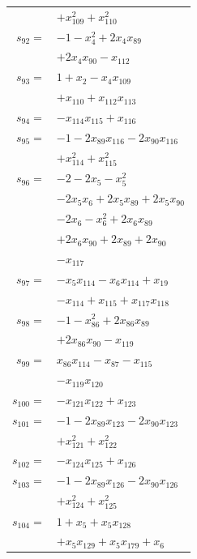 \begin{longtable}{@{}r@{\;}l@{}}
 & \(\displaystyle +x_{109}^{2} +x_{110}^{2}\) \\[3pt]
\(s_{92}=\) & \(\displaystyle -1 -x_{4}^{2} +2x_{4}x_{89}\) \\
 & \(\displaystyle +2x_{4}x_{90} -x_{112}\) \\[3pt]
\(s_{93}=\) & \(\displaystyle 1 +x_{2} -x_{4}x_{109}\) \\
 & \(\displaystyle +x_{110} +x_{112}x_{113}\) \\[3pt]
\(s_{94}=\) & \(\displaystyle -x_{114}x_{115} +x_{116}\) \\[3pt]
\(s_{95}=\) & \(\displaystyle -1 -2x_{89}x_{116} -2x_{90}x_{116}\) \\
 & \(\displaystyle +x_{114}^{2} +x_{115}^{2}\) \\[3pt]
\(s_{96}=\) & \(\displaystyle -2 -2x_{5} -x_{5}^{2}\) \\
 & \(\displaystyle -2x_{5}x_{6} +2x_{5}x_{89} +2x_{5}x_{90}\) \\
 & \(\displaystyle -2x_{6} -x_{6}^{2} +2x_{6}x_{89}\) \\
 & \(\displaystyle +2x_{6}x_{90} +2x_{89} +2x_{90}\) \\
 & \(\displaystyle -x_{117}\) \\[3pt]
\(s_{97}=\) & \(\displaystyle -x_{5}x_{114} -x_{6}x_{114} +x_{19}\) \\
 & \(\displaystyle -x_{114} +x_{115} +x_{117}x_{118}\) \\[3pt]
\(s_{98}=\) & \(\displaystyle -1 -x_{86}^{2} +2x_{86}x_{89}\) \\
 & \(\displaystyle +2x_{86}x_{90} -x_{119}\) \\[3pt]
\(s_{99}=\) & \(\displaystyle x_{86}x_{114} -x_{87} -x_{115}\) \\
 & \(\displaystyle -x_{119}x_{120}\) \\[3pt]
\(s_{100}=\) & \(\displaystyle -x_{121}x_{122} +x_{123}\) \\[3pt]
\(s_{101}=\) & \(\displaystyle -1 -2x_{89}x_{123} -2x_{90}x_{123}\) \\
 & \(\displaystyle +x_{121}^{2} +x_{122}^{2}\) \\[3pt]
\(s_{102}=\) & \(\displaystyle -x_{124}x_{125} +x_{126}\) \\[3pt]
\(s_{103}=\) & \(\displaystyle -1 -2x_{89}x_{126} -2x_{90}x_{126}\) \\
 & \(\displaystyle +x_{124}^{2} +x_{125}^{2}\) \\[3pt]
\(s_{104}=\) & \(\displaystyle 1 +x_{5} +x_{5}x_{128}\) \\
 & \(\displaystyle +x_{5}x_{129} +x_{5}x_{179} +x_{6}\) \\

\end{longtable}
